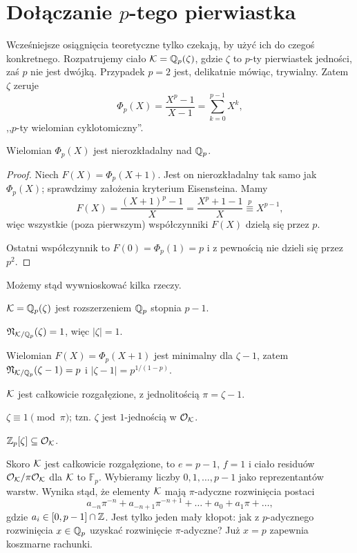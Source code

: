 \section{Dołączanie $p$-tego pierwiastka}
Wcześniejsze osiągnięcia teoretyczne tylko czekają, by użyć ich do czegoś konkretnego.
Rozpatrujemy ciało $\mathcal K = \mathbb Q_p(\zeta)$, gdzie $\zeta$ to $p$-ty pierwiastek jedności, zaś $p$ nie jest dwójką.
Przypadek $p = 2$ jest, delikatnie mówiąc, trywialny.
Zatem $\zeta$ zeruje
\[
	\Phi_p(X) = \frac{X^p-1}{X-1} = \sum_{k=0}^{p-1} X^k,
\]
,,$p$-ty wielomian cyklotomiczny''.

\begin{lemat}
	Wielomian $\Phi_p(X)$ jest nierozkładalny nad $\mathbb Q_p$.
\end{lemat}

\begin{proof}
	Niech $F(X) = \Phi_p(X+1)$. Jest on nierozkładalny tak samo jak $\Phi_p(X)$; sprawdzimy założenia kryterium Eisensteina.
	Mamy
	\[
		F(X)  = \frac{(X+1)^p - 1}{X} = \frac{X^p + 1 - 1}{X} \stackrel {p} \equiv X^{p-1},
	\]
	więc wszystkie (poza pierwszym) współczynniki $F(X)$ dzielą się przez $p$.

	Ostatni współczynnik to $F(0) = \Phi_p(1) = p$ i z pewnością nie dzieli się przez $p^2$.
\end{proof}

Możemy stąd wywnioskować kilka rzeczy.
\begin{enumx}
	\item $\mathcal K = \mathbb Q_p(\zeta)$ jest rozszerzeniem $\mathbb Q_p$ stopnia $p-1$.
	\item $\mathfrak N_{\mathcal K/ \mathbb Q_p}(\zeta) = 1$, więc $|\zeta| = 1$.
	\item Wielomian $F(X) = \Phi_p(X+1)$ jest minimalny dla $\zeta - 1$, zatem $\mathfrak N_{\mathcal K/\mathbb Q_p}(\zeta - 1) = p$ i $|\zeta-1| = p^{1/(1-p)}$.
	\item $\mathcal K$ jest całkowicie rozgałęzione, z jednolitością $\pi = \zeta- 1$.
	\item $\zeta \equiv 1 \pmod \pi$; tzn. $\zeta$ jest $1$-jednością w $\mathcal O_{\mathcal K}$.
	\item $\mathbb Z_p[\zeta] \subseteq \mathcal O_{\mathcal K}$.
\end{enumx}

Skoro $\mathcal K$ jest całkowicie rozgałęzione, to $e = p-1$, $f = 1$ i ciało residuów $\mathcal O_{\mathcal K} / \pi \mathcal O_{\mathcal K}$ dla $\mathcal K$ to $\mathbb F_p$.
Wybieramy liczby $0, 1, \dots, p-1$ jako reprezentantów warstw.
Wynika stąd, że elementy $\mathcal K$ mają $\pi$-adyczne rozwinięcia postaci
\[
	a_{-n}\pi^{-n} + a_{-n+1}\pi^{-n+1} + \ldots + a_0 + a_1 \pi + \ldots,
\]
gdzie $a_i \in [0, p-1] \cap \mathbb Z$.
Jest tylko jeden mały kłopot: jak z $p$-adycznego rozwinięcia $x \in \mathbb Q_p$ uzyskać rozwinięcie $\pi$-adyczne?
Już $x = p$ zapewnia koszmarne rachunki.

